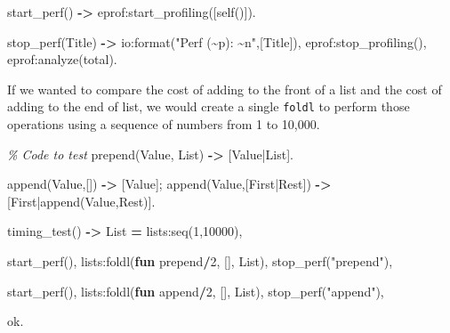 \documentclass[
]{book}
\newenvironment{Shaded}{\begin{snugshade}}{\end{snugshade}}
\newcommand{\CharTok}[1]{\textcolor[rgb]{0.31,0.60,0.02}{#1}}
\newcommand{\CommentTok}[1]{\textcolor[rgb]{0.56,0.35,0.01}{\textit{#1}}}
\newcommand{\DecValTok}[1]{\textcolor[rgb]{0.00,0.00,0.81}{#1}}
\newcommand{\FunctionTok}[1]{\textcolor[rgb]{0.00,0.00,0.00}{#1}}
\newcommand{\KeywordTok}[1]{\textcolor[rgb]{0.13,0.29,0.53}{\textbf{#1}}}
\newcommand{\OperatorTok}[1]{\textcolor[rgb]{0.81,0.36,0.00}{\textbf{#1}}}
\newcommand{\StringTok}[1]{\textcolor[rgb]{0.31,0.60,0.02}{#1}}
\newcommand{\VariableTok}[1]{\textcolor[rgb]{0.00,0.00,0.00}{#1}}
\begin{document}
\begin{Shaded}
\begin{Highlighting}[]
\FunctionTok{start\_perf()} \OperatorTok{{-}\textgreater{}}
    \FunctionTok{eprof:start\_profiling([self()]).}

\FunctionTok{stop\_perf(}\VariableTok{Title}\FunctionTok{)} \OperatorTok{{-}\textgreater{}}
    \FunctionTok{io:format(}\StringTok{"Perf (\textasciitilde{}p): \textasciitilde{}n"}\FunctionTok{,[}\VariableTok{Title}\FunctionTok{]),}
    \FunctionTok{eprof:stop\_profiling(),}
    \FunctionTok{eprof:analyze(}\CharTok{total}\FunctionTok{).}
\end{Highlighting}
\end{Shaded}

If we wanted to compare the cost of adding to the front of a list and the cost of adding to the end of list, we would create a single \texttt{foldl} to perform those operations using a sequence of numbers from 1 to 10,000.

\begin{Shaded}
\begin{Highlighting}[]
\CommentTok{\% Code to test}
\FunctionTok{prepend(}\VariableTok{Value}\FunctionTok{,} \VariableTok{List}\FunctionTok{)} \OperatorTok{{-}\textgreater{}} \FunctionTok{[}\VariableTok{Value}\FunctionTok{|}\VariableTok{List}\FunctionTok{].}

\FunctionTok{append(}\VariableTok{Value}\FunctionTok{,[])} \OperatorTok{{-}\textgreater{}} \FunctionTok{[}\VariableTok{Value}\FunctionTok{];}
\FunctionTok{append(}\VariableTok{Value}\FunctionTok{,[}\VariableTok{First}\FunctionTok{|}\VariableTok{Rest}\FunctionTok{])} \OperatorTok{{-}\textgreater{}} \FunctionTok{[}\VariableTok{First}\FunctionTok{|append(}\VariableTok{Value}\FunctionTok{,}\VariableTok{Rest}\FunctionTok{)].}

\FunctionTok{timing\_test()} \OperatorTok{{-}\textgreater{}}
    \VariableTok{List} \OperatorTok{=} \FunctionTok{lists:seq(}\DecValTok{1}\FunctionTok{,}\DecValTok{10000}\FunctionTok{),}
    
    \FunctionTok{start\_perf(),}
    \FunctionTok{lists:foldl(}\KeywordTok{fun} \CharTok{prepend}\OperatorTok{/}\DecValTok{2}\FunctionTok{,} \FunctionTok{[],} \VariableTok{List}\FunctionTok{),}
    \FunctionTok{stop\_perf(}\StringTok{"prepend"}\FunctionTok{),}

    \FunctionTok{start\_perf(),}
    \FunctionTok{lists:foldl(}\KeywordTok{fun} \CharTok{append}\OperatorTok{/}\DecValTok{2}\FunctionTok{,} \FunctionTok{[],} \VariableTok{List}\FunctionTok{),}
    \FunctionTok{stop\_perf(}\StringTok{"append"}\FunctionTok{),}

    \CharTok{ok}\FunctionTok{.}
\end{Highlighting}
\end{Shaded}
\end{document}
